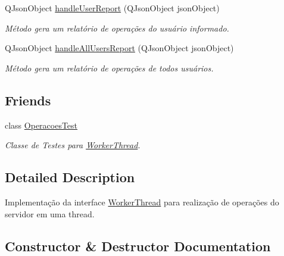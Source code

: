 \begin{DoxyCompactItemize}
Q\+Json\+Object \hyperlink{classWorkerThreadImpl_a9ce30db393c61dd414d198b1dcb38ddb}{handle\+User\+Report} (Q\+Json\+Object json\+Object)
\begin{DoxyCompactList}\small\item\em Método gera um relatório de operações do usuário informado. \end{DoxyCompactList}\item 
Q\+Json\+Object \hyperlink{classWorkerThreadImpl_a31f8bcb7340bc4a2497d12e5bbf4c203}{handle\+All\+Users\+Report} (Q\+Json\+Object json\+Object)
\begin{DoxyCompactList}\small\item\em Método gera um relatório de operações de todos usuários. \end{DoxyCompactList}\end{DoxyCompactItemize}
\subsection*{Friends}
\begin{DoxyCompactItemize}
\item 
class \hyperlink{classWorkerThreadImpl_a9b782f47c630bd470969aeba01a706b2}{Operacoes\+Test}\hypertarget{classWorkerThreadImpl_a9b782f47c630bd470969aeba01a706b2}{}\label{classWorkerThreadImpl_a9b782f47c630bd470969aeba01a706b2}

\begin{DoxyCompactList}\small\item\em Classe de Testes para \hyperlink{classWorkerThread}{Worker\+Thread}. \end{DoxyCompactList}\end{DoxyCompactItemize}


\subsection{Detailed Description}
Implementação da interface \hyperlink{classWorkerThread}{Worker\+Thread} para realização de operações do servidor em uma thread. 

\subsection{Constructor \& Destructor Documentation}
